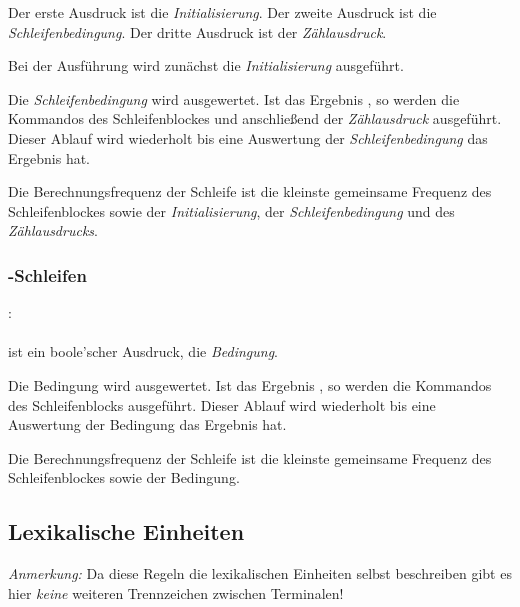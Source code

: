 Der erste Ausdruck ist die \emph{Initialisierung}. Der zweite Ausdruck ist die \emph{Schleifenbedingung}. Der dritte Ausdruck ist der \emph{Zählausdruck}.

Bei der Ausführung wird zunächst die \emph{Initialisierung} ausgeführt.

Die \emph{Schleifenbedingung} wird ausgewertet. Ist das Ergebnis , so werden die Kommandos des Schleifenblockes
und anschließend der \emph{Zählausdruck} ausgeführt.
Dieser Ablauf wird wiederholt bis eine Auswertung der \emph{Schleifenbedingung} das Ergebnis  hat.

Die Berechnungsfrequenz der Schleife ist die kleinste gemeinsame Frequenz des Schleifenblockes sowie
der \emph{Initialisierung}, der \emph{Schleifenbedingung} und des \emph{Zählausdrucks}.

\subsubsection{-Schleifen}\label{$_backslash$kw__while__-Schleifen}
:\label{schleife_while}\\
\hspace*{1cm}\glq{}\grq  \glq\Gt{(}\grq  {}  \glq\Gt{)}\grq  \glq\Gt{\{}\grq  {}  \glq\Gt{\}}\grq \\

\glq{}\grq ist ein boole'scher Ausdruck, die \emph{Bedingung}.

Die Bedingung wird ausgewertet. Ist das Ergebnis , so werden die Kommandos des Schleifenblocks
ausgeführt. Dieser Ablauf wird wiederholt bis eine Auswertung der Bedingung das Ergebnis  hat.

Die Berechnungsfrequenz der Schleife ist die kleinste gemeinsame Frequenz des Schleifenblockes sowie der Bedingung.

\subsection{Lexikalische Einheiten}\label{Lexikalische Einheiten}

\emph{Anmerkung:} Da diese Regeln die lexikalischen Einheiten selbst beschreiben gibt es
hier \emph{keine} weiteren Trennzeichen zwischen Terminalen!


